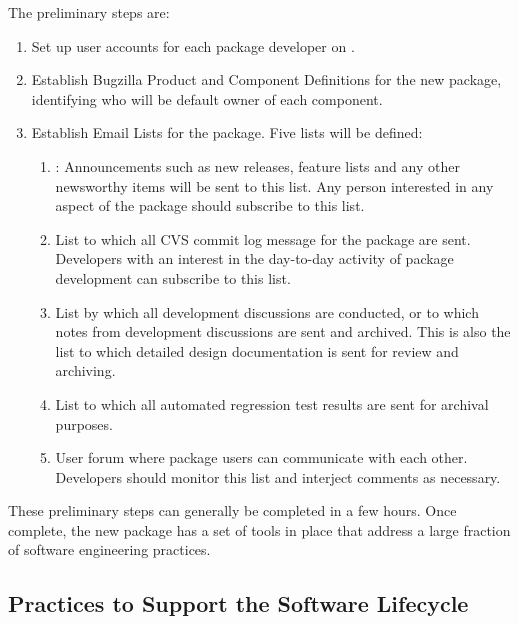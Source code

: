 \documentclass[12pt,relax]{TrilinosDevGuide}
\begin{document}
The preliminary steps are:
\begin{enumerate}
\item Set up user accounts for each package developer 
on .
\item Establish Bugzilla Product and Component Definitions for the new
package, identifying who will be default owner of each component.
\item Establish Email Lists for the package.  Five lists will be
defined:
\begin{enumerate}
\item {}: 
Announcements such as 
new releases, feature lists and any other newsworthy items will be
sent to this list.  Any person interested in any aspect of the package
should subscribe to this list.
\item {} List
to which all CVS commit log message for the package are sent.
Developers with an interest in the day-to-day activity of package
development can subscribe to this list.
\item {}
List by which all development discussions are conducted, or to which
notes from development discussions are sent and archived.  This is
also the list to which detailed design documentation is sent for
review and archiving.
\item {} List
to which all automated regression test results are sent for archival purposes.
\item {} User
forum where package users can communicate with each other.  Developers
should monitor this list and interject comments as necessary.
\end{enumerate}
\end{enumerate}
These preliminary steps can generally be completed in a few hours.
Once complete, the new package has a set of tools in place that
address a large fraction of software engineering practices.

\subsection{Practices to Support the Software Lifecycle}
\end{document}
